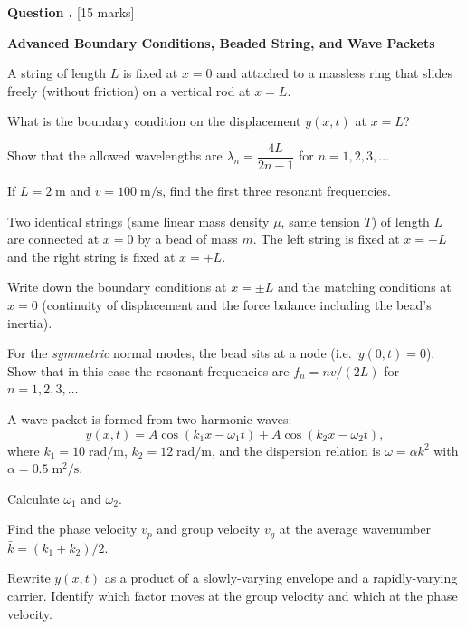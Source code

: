 \documentclass[12pt,a4paper]{article}
\newcounter{questioncounter}
\newcommand{\question}[1]{%
  \stepcounter{questioncounter}%
  \vspace{0.5cm}%
  \noindent\textbf{Question \thequestioncounter.} \hfill [#1 marks]%
  \vspace{0.2cm}%
  \par%
}
\begin{document}
\newpage

\question{15}

\noindent\textbf{Advanced Boundary Conditions, Beaded String, and Wave Packets}

\begin{parts}
\item A string of length $L$ is fixed at $x = 0$ and attached to a massless ring that slides freely (without friction) on a vertical rod at $x = L$.
\begin{parts}
\item What is the boundary condition on the displacement $y(x,t)$ at $x = L$? 
\item Show that the allowed wavelengths are $\lambda_n = \dfrac{4L}{2n - 1}$ for $n = 1, 2, 3, \ldots$ 
\item If $L = 2\;\text{m}$ and $v = 100\;\text{m/s}$, find the first three resonant frequencies. 
\end{parts}

\item Two identical strings (same linear mass density $\mu$, same tension $T$) of length $L$ are connected at $x = 0$ by a bead of mass $m$. The left string is fixed at $x = -L$ and the right string is fixed at $x = +L$.
\begin{parts}
\item Write down the boundary conditions at $x = \pm L$ and the matching conditions at $x = 0$ (continuity of displacement and the force balance including the bead's inertia). 
\item For the \emph{symmetric} normal modes, the bead sits at a node (i.e.\ $y(0,t) = 0$). Show that in this case the resonant frequencies are $f_n = nv/(2L)$ for $n = 1, 2, 3, \ldots$ 
\end{parts}

\item A wave packet is formed from two harmonic waves:
\[
y(x,t) = A\cos(k_1 x - \omega_1 t) + A\cos(k_2 x - \omega_2 t),
\]
where $k_1 = 10\;\text{rad/m}$, $k_2 = 12\;\text{rad/m}$, and the dispersion relation is $\omega = \alpha k^2$ with $\alpha = 0.5\;\text{m}^2/\text{s}$.
\begin{parts}
\item Calculate $\omega_1$ and $\omega_2$. 
\item Find the phase velocity $v_p$ and group velocity $v_g$ at the average wavenumber $\bar{k} = (k_1 + k_2)/2$. 
\item Rewrite $y(x,t)$ as a product of a slowly-varying envelope and a rapidly-varying carrier. Identify which factor moves at the group velocity and which at the phase velocity. 
\end{parts}
\end{parts}
\end{document}

